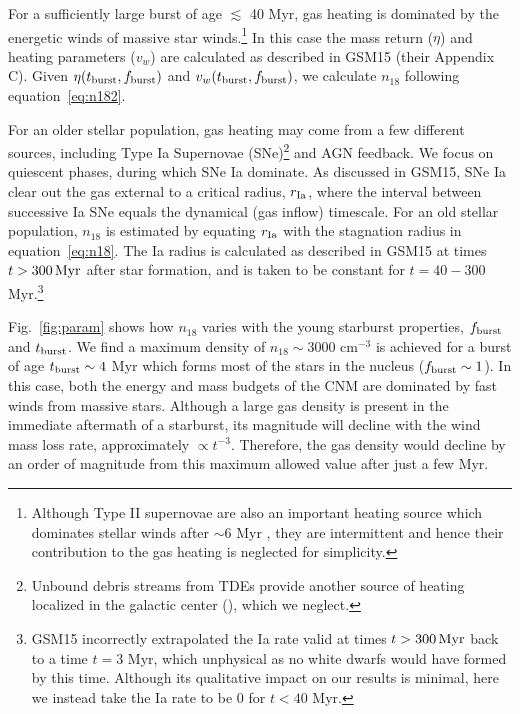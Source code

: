 \documentclass[usenatbib,fleqn]{mnras}
\newcommand{\Msun}{{\rm M_\odot}}
\begin{document}
For a sufficiently large burst of age $\lesssim$ 40 Myr, gas
heating is dominated by the energetic winds of massive star
winds.\footnote{Although Type II supernovae are also an important heating
  source which dominates stellar winds after $\sim$6 Myr
  \citep{Voss+2009}, they are intermittent and hence their
  contribution to the gas heating is neglected for simplicity.}  In
this case the mass return ($\eta$) and heating parameters ($v_w$) are
calculated as described in GSM15 (their Appendix C).  Given
$\eta(t_{\rm burst},f_{\rm burst})$ and $v_w(t_{\rm burst},f_{\rm
  burst})$, we calculate $n_{18}$ following equation~\eqref{eq:n182}.

For an older stellar population, gas heating may come from a few
different sources, including Type Ia Supernovae (SNe)\footnote{Unbound
  debris streams from TDEs provide another source of heating localized
  in the galactic center (\citealt{Guillochon+2015a}), which we
  neglect.} and AGN feedback.  We focus on
quiescent phases, during which SNe Ia dominate.  As discussed in
GSM15, SNe Ia clear out the gas external to a critical radius, $r_{\rm
  Ia}$, where the interval between successive Ia SNe equals the
dynamical (gas inflow) timescale.  For an old stellar population,
$n_{18}$ is estimated by equating $r_{\rm Ia}$ with the stagnation
radius in equation~\eqref{eq:n18}.  The Ia radius is calculated as
described in GSM15 at times $t>300 \,{\rm Myr}$ after star formation,
and is taken to be constant for $t = 40-300$ Myr.\footnote{GSM15
  incorrectly extrapolated the Ia rate valid at times $t>300 \,{\rm
    Myr}$ back to a time $t = 3$ Myr, which unphysical as no white
  dwarfs would have formed by this time.  Although its qualitative
  impact on our results is minimal, here we instead take the Ia rate
  to be 0 for $ t < 40$ Myr.}


Fig.~\ref{fig:param} shows how $n_{18}$ varies with the young
starburst properties, $f_{\rm burst}$ and $t_{\rm burst}$.  We find a
maximum density of $n_{18} \sim 3000$ cm$^{-3}$ is achieved for a
burst of age $t_{\rm burst} \sim 4$ Myr which forms most of the stars
in the nucleus ($f_{\rm burst} \sim 1$).  In this case, both the energy
and mass budgets of the CNM are dominated by fast winds from massive
stars.  Although a large gas density is present in the immediate
aftermath of a starburst, its magnitude will decline with the wind
mass loss rate, approximately $\propto t^{-3}$.  Therefore, the gas
density would decline by an order of magnitude from this maximum
allowed value after just a few Myr.
\end{document}
